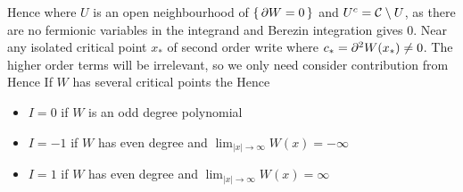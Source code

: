 \documentclass{article}
\begin{document}
Hence 
where $U$ is an open neighbourhood of $\set{ \partial W = 0}$ and $U^c = \mathcal{C}\setminus U$, as there are no fermionic variables in the integrand and Berezin integration gives 0. Near any isolated critical point $x_\ast$ of second order write  
where $c_\ast = \partial^2W(x_\ast)\neq 0$. The higher order terms will be irrelevant, so we only need consider contribution from
Hence 
If $W$ has several critical points the 
Hence 
\begin{itemize}
    \item $I=0$ if $W$ is an odd degree polynomial
    \item $I=-1$ if $W$ has even degree and $\lim_{|x|\to\infty} W(x) = -\infty$
    \item $I=1$ if $W$ has even degree and $\lim_{|x|\to\infty} W(x) = \infty$
\end{itemize}

\end{document}
